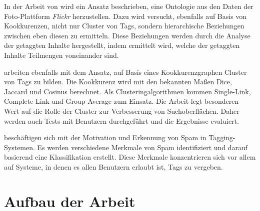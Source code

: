 In der Arbeit von \textcite{ps2006} wird ein Ansatz beschrieben, eine Ontologie aus den Daten der Foto-Plattform \emph{Flickr} herzustellen. Dazu wird versucht, ebenfalls auf Basis von Kookkurenzen, nicht nur Cluster von Tags, sondern hierarchische Beziehungen zwischen eben diesen zu ermitteln. Diese Beziehungen werden durch die Analyse der getaggten Inhalte hergestellt, indem ermittelt wird, welche der getaggten Inhalte Teilmengen voneinander sind.

\textcite{kss2010} arbeiten ebenfalls mit dem Ansatz, auf Basis eines Kookkurenzgraphen Cluster von Tags zu bilden. Die Kookkurenz wird mit den bekannten Maßen Dice, Jaccard und Cosinus berechnet. Als Clusteringalgorithmen kommen Single-Link, Complete-Link und Group-Average zum Einsatz. Die Arbeit legt besonderen Wert auf die Rolle der Cluster zur Verbesserung von Suchoberflächen. Daher werden auch Tests mit Benutzern durchgeführt und die Ergebnisse evaluiert.

\textcite{mcf2009} beschäftigen sich mit der Motivation und Erkennung von Spam in Tagging-Systemen. Es werden verschiedene Merkmale von Spam identifiziert und darauf basierend eine Klassifikation erstellt. Diese Merkmale konzentrieren sich vor allem auf Systeme, in denen es allen Benutzern erlaubt ist, Tags zu vergeben.

\section{Aufbau der Arbeit}